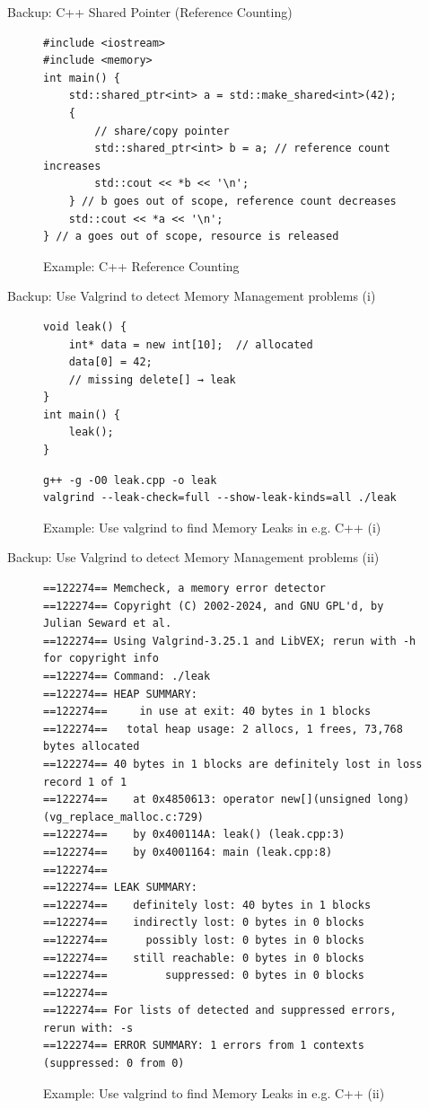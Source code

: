 \begin{frame}[fragile]{Backup: C++ Shared Pointer (Reference Counting)}
	\begin{figure}
		\centering
		\begin{verbatim}
#include <iostream>
#include <memory>
int main() {
    std::shared_ptr<int> a = std::make_shared<int>(42);
    {
		// share/copy pointer
        std::shared_ptr<int> b = a; // reference count increases
        std::cout << *b << '\n';
    } // b goes out of scope, reference count decreases
    std::cout << *a << '\n';
} // a goes out of scope, resource is released
		\end{verbatim}
		\caption{Example: C++ Reference Counting}
	\end{figure}
\end{frame}

\begin{frame}[fragile]{Backup: Use Valgrind to detect Memory Management problems (i)}
	\begin{figure}
		\centering
		\begin{verbatim}
void leak() {
    int* data = new int[10];  // allocated
    data[0] = 42;
    // missing delete[] → leak
}
int main() {
    leak();
}
		\end{verbatim}
		\begin{verbatim}
g++ -g -O0 leak.cpp -o leak
valgrind --leak-check=full --show-leak-kinds=all ./leak
		\end{verbatim}
		\caption{Example: Use valgrind to find Memory Leaks in e.g. C++ (i)}
	\end{figure}
\end{frame}

\begin{frame}[fragile]{Backup: Use Valgrind to detect Memory Management problems (ii)}
	\begin{figure}
		\centering
		\begin{verbatim}
==122274== Memcheck, a memory error detector
==122274== Copyright (C) 2002-2024, and GNU GPL'd, by Julian Seward et al.
==122274== Using Valgrind-3.25.1 and LibVEX; rerun with -h for copyright info
==122274== Command: ./leak
==122274== HEAP SUMMARY:
==122274==     in use at exit: 40 bytes in 1 blocks
==122274==   total heap usage: 2 allocs, 1 frees, 73,768 bytes allocated
==122274== 40 bytes in 1 blocks are definitely lost in loss record 1 of 1
==122274==    at 0x4850613: operator new[](unsigned long) (vg_replace_malloc.c:729)
==122274==    by 0x400114A: leak() (leak.cpp:3)
==122274==    by 0x4001164: main (leak.cpp:8)
==122274== 
==122274== LEAK SUMMARY:
==122274==    definitely lost: 40 bytes in 1 blocks
==122274==    indirectly lost: 0 bytes in 0 blocks
==122274==      possibly lost: 0 bytes in 0 blocks
==122274==    still reachable: 0 bytes in 0 blocks
==122274==         suppressed: 0 bytes in 0 blocks
==122274== 
==122274== For lists of detected and suppressed errors, rerun with: -s
==122274== ERROR SUMMARY: 1 errors from 1 contexts (suppressed: 0 from 0)
		\end{verbatim}
		\caption{Example: Use valgrind to find Memory Leaks in e.g. C++ (ii)}
	\end{figure}
\end{frame}
